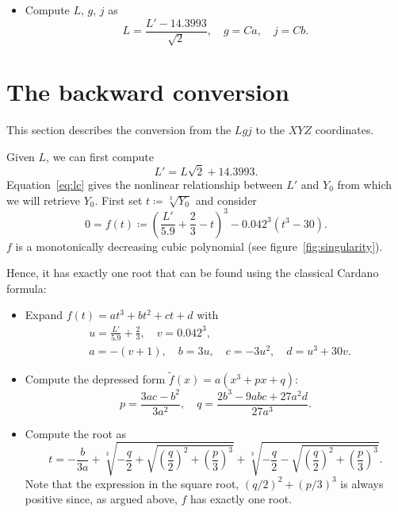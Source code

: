 \documentclass{scrartcl}
\theoremstyle{named}
\begin{document}
\begin{itemize}
  \item Compute $L$, $g$, $j$ as
    \[
      L = \frac{L' - 14.3993}{\sqrt{2}},\quad g = Ca,\quad j = Cb.
    \]
\end{itemize}

\section{The backward conversion}

This section describes the conversion from the  $Lgj$ to the $XYZ$ coordinates.

Given $L$, we can first compute
\[
  L' = L \sqrt{2} + 14.3993.
\]
Equation~\eqref{eq:lc} gives the nonlinear relationship between $L'$ and $Y_0$ from
which we will retrieve $Y_0$. First set $t\coloneqq \sqrt[3]{Y_0}$ and consider
\begin{equation}\label{eq:f}
  0 = f(t) \coloneqq {\left(\frac{L'}{5.9} + \frac{2}{3} - t\right)}^3 - 0.042^3 (t^3 - 30).
\end{equation}
$f$ is a monotonically decreasing cubic polynomial (see figure~\ref{fig:singularity}).

Hence, it has exactly one root that can be found using the classical Cardano formula:

\begin{itemize}
  \item Expand $f(t) = at^3 + bt^2 + ct + d$ with
    \[
      \begin{split}
        &u = \frac{L'}{5.9} + \frac{2}{3},\quad v = 0.042^3,\\
        &a = -(v + 1),\quad  b = 3u,\quad  c = -3u^2, \quad d = u^3 + 30v.
      \end{split}
    \]

  \item Compute the depressed form $\tilde{f}(x)=a(x^3 + px + q)$:
    \[
      p = \frac{3ac - b^2}{3a^2},\quad q = \frac{2b^3 - 9abc + 27a^2d}{27a^3}.
    \]

  \item Compute the root as
    \[
      t = -\frac{b}{3a} + \sqrt[3]{
        -\frac{q}{2} + \sqrt{{\left(\frac{q}{2}\right)}^2 + {\left(\frac{p}{3}\right)}^3}
      }
      + \sqrt[3]{
        -\frac{q}{2} - \sqrt{{\left(\frac{q}{2}\right)}^2 + {\left(\frac{p}{3}\right)}^3}
      }.
    \]
    Note that the expression in the square root, ${\left(q/2\right)}^2 +
    {\left(p/3\right)}^3$ is always positive since, as argued above, $f$ has
    exactly one root.
\end{itemize}
\end{document}
